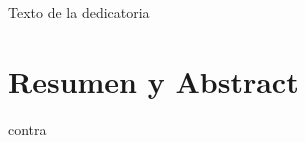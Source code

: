 \documentclass[11pt, twoside]{book}  %
\author{Víctor Vallejo Uroz}
\begin{document}
\frontmatter

\portada



\begin{dedicatoria}
    Texto de la dedicatoria
\end{dedicatoria}





\chapter*{Resumen y Abstract}




\mainmatter
\marcagua













\clearpage
{}
{}


\appendix


%

\clearpage
\backmatter
 {contra}
\end{document}
